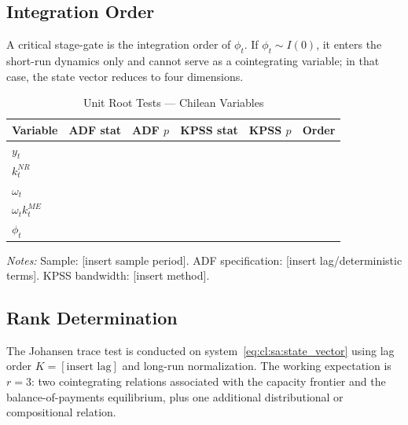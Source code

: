 \subsection{Integration Order}
\label{app:cl:integration}

A critical stage-gate is the integration order of $\phi_t$. If
$\phi_t \sim I(0)$, it enters the short-run dynamics only and cannot
serve as a cointegrating variable; in that case, the state vector
reduces to four dimensions.

\begin{table}[htbp]
	\centering
	\caption{Unit Root Tests --- Chilean Variables}
	\label{tab:cl:sa:unit_root}
	\begin{threeparttable}
		\begin{tabular}{lccccc}
			\toprule
			Variable & ADF stat & ADF $p$ & KPSS stat & KPSS $p$ & Order \\
			\midrule
			$y_t$                &  &  &  &  &  \\
			$k_t^{NR}$           &  &  &  &  &  \\
			$\omega_t$           &  &  &  &  &  \\
			$\omega_t k_t^{ME}$  &  &  &  &  &  \\
			$\phi_t$             &  &  &  &  &  \\
			\bottomrule
		\end{tabular}
		\begin{tablenotes}
			\small
			\item \textit{Notes:} Sample: [insert sample period]. ADF specification: [insert lag/deterministic terms]. KPSS bandwidth: [insert method].
		\end{tablenotes}
	\end{threeparttable}
\end{table}


\subsection{Rank Determination}
\label{app:cl:rank}

The Johansen trace test is conducted on
system~\eqref{eq:cl:sa:state_vector} using lag order $K = [\text{insert lag}]$
and long-run normalization. The working expectation is $r = 3$:
two cointegrating relations associated with the capacity frontier and
the balance-of-payments equilibrium, plus one additional
distributional or compositional relation.

